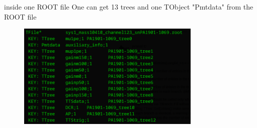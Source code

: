 \documentclass[11pt,compress,xcolor=x11names,UTF8]{beamer}
\begin{document}
\begin{frame}{inside one ROOT file}
One can get 13 trees and one TObject "Pmtdata" from the ROOT file
\begin{figure}
\centering
\includegraphics[width=0.78\textwidth]{rootfile} %
\end{figure}
\end{frame}
\end{document}
